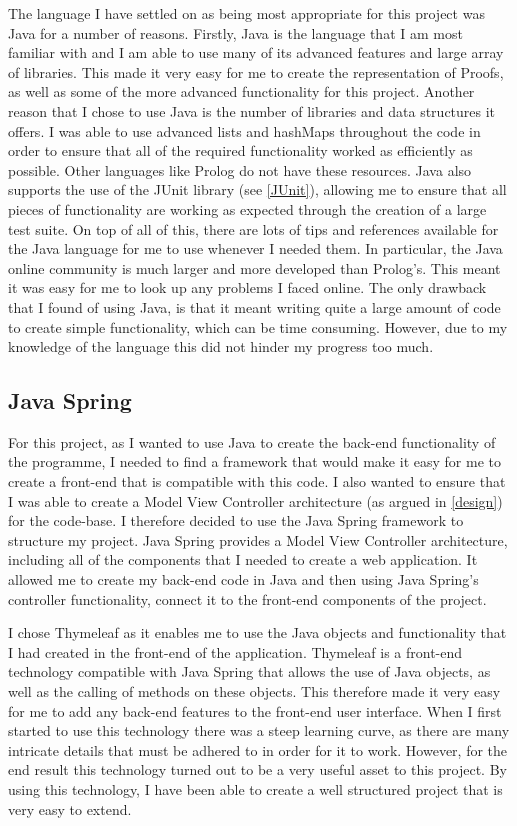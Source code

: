 The language I have settled on as being most appropriate for this project was Java for a number of reasons. Firstly, Java is the language that I am most familiar with and I am able to use many of its advanced features and large array of libraries. This made it very easy for me to create the representation of Proofs, as well as some of the more advanced functionality for this project. Another reason that I chose to use Java is the number of libraries and data structures it offers. I was able to use advanced lists and hashMaps throughout the code in order to ensure that all of the required functionality worked as efficiently as possible. Other languages like Prolog do not have these resources. Java also supports the use of the JUnit library (see \ref{JUnit}), allowing me to ensure that all pieces of functionality are working as expected through the creation of a large test suite. On top of all of this, there are lots of tips and references available for the Java language for me to use whenever I needed them. In particular, the Java online community is much larger and more developed than Prolog's. This meant it was easy for me to look up any problems I faced online. The only drawback that I found of using Java, is that it meant writing quite a large amount of code to create simple functionality, which can be time consuming. However, due to my knowledge of the language this did not hinder my progress too much. 


\subsection{Java Spring \label{JavaSpring}}

For this project, as I wanted to use Java to create the back-end functionality of the programme, I needed to find a framework that would make it easy for me to create a front-end that is compatible with this code. I also wanted to ensure that I was able to create a Model View Controller architecture (as argued in \ref{design}) for the code-base. I therefore decided to use the Java Spring framework to structure my project. Java Spring provides a Model View Controller architecture, including all of the components that I needed to create a web application. It allowed me to create my back-end code in Java and then using Java Spring's controller functionality, connect it to the front-end components of the project. 

I chose Thymeleaf as it enables me to use the Java objects and functionality that I had created in the front-end of the application. Thymeleaf is a front-end technology compatible with Java Spring that allows the use of Java objects, as well as the calling of methods on these objects. This therefore made it very easy for me to add any back-end features to the front-end user interface. When I first started to use this technology there was a steep learning curve, as there are many intricate details that must be adhered to in order for it to work. However, for the end result this technology turned out to be a very useful asset to this project. By using this technology, I have been able to create a well structured project that is very easy to extend.

